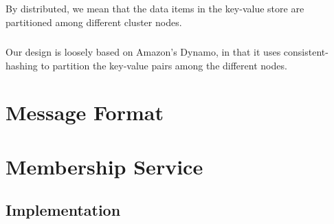 \documentclass{report}
\begin{document}
			\paragraph{}By distributed, we mean that the data items in the key-value
			store are partitioned among different cluster nodes.
			
			\paragraph{} Our design is loosely based on Amazon's Dynamo, in that it
			uses consistent-hashing to partition the key-value pairs among the 
			different nodes.
	
	\chapter{Message Format}

			\paragraph{}
	        
	        \paragraph{}

	\chapter{Membership Service}
	
	        \paragraph{}
	        
	        \paragraph{}

			\section{Implementation}
	
				\paragraph{}
				
				\paragraph{}
	
\end{document}

